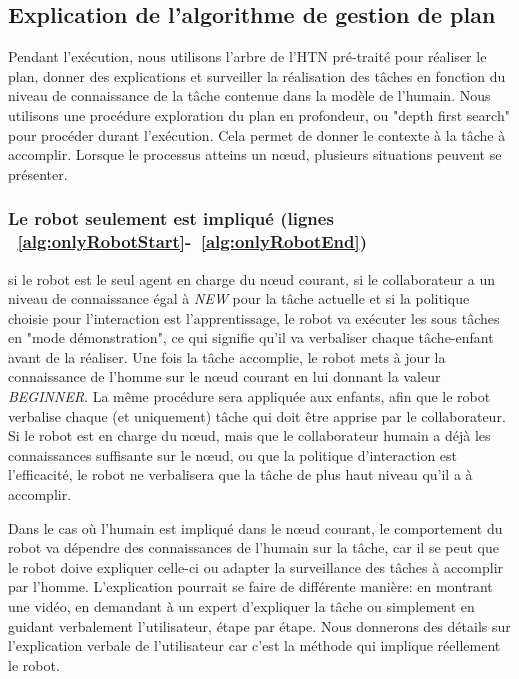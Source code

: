 \documentclass[a4paper,11pt,twoside]{StyleThese}
\begin{document}
\subsection{Explication de l'algorithme de gestion de plan}
Pendant l'exécution, nous utilisons l'arbre de l'HTN pré-traité pour réaliser le plan, donner des explications et surveiller la réalisation des tâches en fonction du niveau de connaissance de la tâche contenue dans la modèle de l'humain.
Nous utilisons une procédure exploration du plan en profondeur, ou "depth first search" pour procéder durant l'exécution. Cela permet de donner le contexte à la tâche à accomplir.
Lorsque le processus atteins un nœud, plusieurs situations peuvent se présenter.

\subsubsection{Le robot seulement est impliqué (lignes ~\ref{alg:onlyRobotStart}-~\ref{alg:onlyRobotEnd})} si le robot est le seul agent en charge du nœud courant, si le collaborateur a un niveau de connaissance égal à \textit{NEW} pour la tâche actuelle et si la politique choisie pour l'interaction est l'apprentissage, le robot va exécuter les sous tâches en "mode démonstration", ce qui signifie qu'il va verbaliser chaque tâche-enfant avant de la réaliser. Une fois la tâche accomplie, le robot mets à jour la connaissance de l'homme sur le nœud courant en lui donnant la valeur \textit{BEGINNER}. La même procédure sera appliquée aux enfants, afin que le robot verbalise chaque (et uniquement) tâche qui doit être apprise par le collaborateur.
Si le robot est en charge du nœud, mais que le collaborateur humain a déjà les connaissances suffisante sur le nœud, ou que la politique d'interaction est l'efficacité, le robot ne verbalisera que la tâche de plus haut niveau qu'il a à accomplir.

Dans le cas où l'humain est impliqué dans le nœud courant, le comportement du robot va dépendre des connaissances de l'humain sur la tâche, car il se peut que le robot doive expliquer celle-ci ou adapter la surveillance des tâches à accomplir par l'homme.
L'explication pourrait se faire de différente manière: en montrant une vidéo, en demandant à un expert d'expliquer la tâche ou simplement en guidant verbalement l'utilisateur, étape par étape. Nous donnerons des détails sur l'explication verbale de l'utilisateur car c'est la méthode qui implique réellement le robot.
\end{document}
